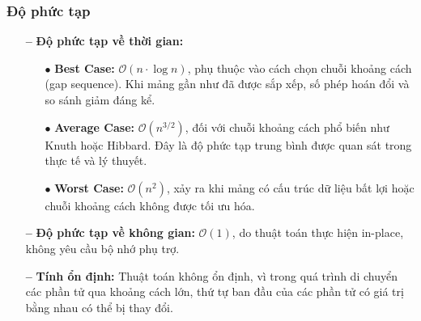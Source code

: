 \subsubsection{Độ phức tạp}
\begin{itemize}
    \item[\textbf{--}] \textbf{Độ phức tạp về thời gian:}
    \begin{itemize}
        \item[$\bullet$] \textbf{Best Case:} $\mathcal{O}(n \cdot \log n)$, phụ thuộc vào cách chọn chuỗi khoảng cách (gap sequence). Khi mảng gần như đã được sắp xếp, số phép hoán đổi và so sánh giảm đáng kể.
        \item[$\bullet$] \textbf{Average Case:} $\mathcal{O}(n^{3/2})$, đối với chuỗi khoảng cách phổ biến như Knuth hoặc Hibbard. Đây là độ phức tạp trung bình được quan sát trong thực tế và lý thuyết.
        \item[$\bullet$] \textbf{Worst Case:} $\mathcal{O}(n^2)$, xảy ra khi mảng có cấu trúc dữ liệu bất lợi hoặc chuỗi khoảng cách không được tối ưu hóa.
    \end{itemize}
    \item[\textbf{--}] \textbf{Độ phức tạp về không gian:} $\mathcal{O}(1)$, do thuật toán thực hiện in-place, không yêu cầu bộ nhớ phụ trợ.
    \item[\textbf{--}] \textbf{Tính ổn định:} Thuật toán không ổn định, vì trong quá trình di chuyển các phần tử qua khoảng cách lớn, thứ tự ban đầu của các phần tử có giá trị bằng nhau có thể bị thay đổi.
\end{itemize}

